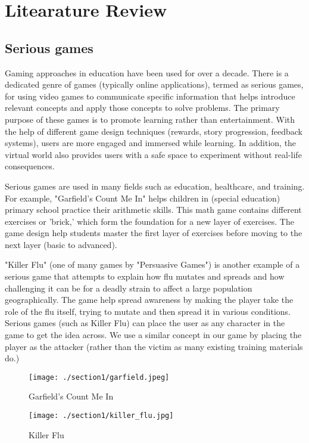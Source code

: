 \section{Litearature Review}
\subsection{Serious games}
Gaming approaches in education have been used for over a decade\cite{almeida_2012}. There is a dedicated genre of games (typically online applications), termed as serious games, for using video games to communicate specific information that helps introduce relevant concepts and apply those concepts to solve problems. The primary purpose of these games is to promote learning rather than entertainment. With the help of different game design techniques (rewards, story progression, feedback systems), users are more engaged and immersed while learning. In addition, the virtual world also provides users with a safe space to experiment without real-life consequences.

Serious games are used in many fields such as education, healthcare, and training. For example, "Garfield's Count Me In" \cite{count_me_in} helps children in (special education) primary school practice their arithmetic skills. This math game contains different exercises or 'brick,' which form the foundation for a new layer of exercises. The game design help students master the first layer of exercises before moving to the next layer (basic to advanced).

"Killer Flu" \cite{killer_flu} (one of many games by "Persuasive Games") is another example of a serious game that attempts to explain how flu mutates and spreads and how challenging it can be for a deadly strain to affect a large population geographically. The game help spread awareness by making the player take the role of the flu itself, trying to mutate and then spread it in various conditions. Serious games (such as Killer Flu) can place the user as any character in the game to get the idea across. We use a similar concept in our game by placing the player as the attacker (rather than the victim as many existing training materials do.)


\begin{figure}[h]
    \centering
    \begin{minipage}{0.49\textwidth}
        \centering
        \texttt{[image: ./section1/garfield.jpeg]}
        \caption{Garfield's Count Me In}
    \end{minipage} \hfill
    \begin{minipage}{0.49\textwidth}
        \centering
        \texttt{[image: ./section1/killer\_flu.jpg]}
        \caption{Killer Flu}
    \end{minipage} \hfill
\end{figure}

